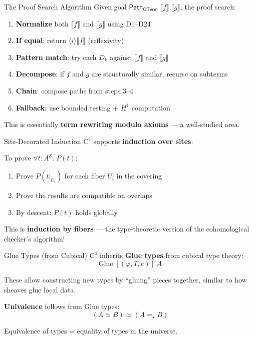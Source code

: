 \documentclass[aspectratio=169,11pt]{beamer}
\newcommand{\Cfour}{\mathrm{C}^4}
\newcommand{\Path}{\mathsf{Path}}
\newcommand{\OTerm}{\mathsf{OTerm}}
\newcommand{\site}{\mathcal{S}}
\newcommand{\den}[1]{\llbracket #1 \rrbracket}
\begin{document}
\begin{frame}{The Proof Search Algorithm}
Given goal $\Path_\OTerm\;\den{f}\;\den{g}$, the proof search:

\begin{enumerate}
\item \textbf{Normalize} both $\den{f}$ and $\den{g}$ using D1--D24
\item \textbf{If equal}: return $\langle i \rangle \den{f}$ (reflexivity)
\item \textbf{Pattern match}: try each $D_k$ against $\den{f}$ and $\den{g}$
\item \textbf{Decompose}: if $f$ and $g$ are structurally similar, recurse on subterms
\item \textbf{Chain}: compose paths from steps 3--4
\item \textbf{Fallback}: use bounded testing + $H^1$ computation
\end{enumerate}

\vspace{0.3em}
This is essentially \textbf{term rewriting modulo axioms} --- a well-studied area.
\end{frame}

\begin{frame}{Site-Decorated Induction}
$\Cfour$ supports \textbf{induction over sites}:

\vspace{0.5em}
To prove $\forall t : A^{\site}.\; P(t)$:
\begin{enumerate}
\item Prove $P(t|_{U_i})$ for each fiber $U_i$ in the covering
\item Prove the results are compatible on overlaps
\item By descent: $P(t)$ holds globally
\end{enumerate}

\vspace{0.5em}
This is \textbf{induction by fibers} --- the type-theoretic version of the cohomological checker's algorithm!
\end{frame}

\begin{frame}{Glue Types (from Cubical)}
$\Cfour$ inherits \textbf{Glue types} from cubical type theory:
\[
\mathrm{Glue}\;[(\varphi, T, e)]\;A
\]

\vspace{0.5em}
These allow constructing new types by ``gluing'' pieces together, similar to how sheaves glue local data.

\vspace{0.5em}
\textbf{Univalence} follows from Glue types:
\[
(A \simeq B) \simeq (A =_{\star} B)
\]

\vspace{0.3em}
Equivalence of types = equality of types in the universe.
\end{frame}
\end{document}
